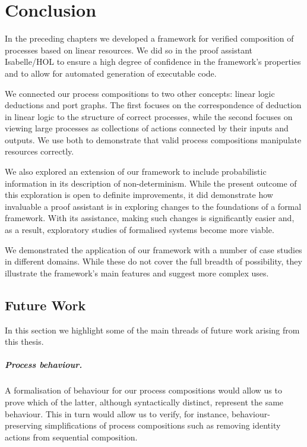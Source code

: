 \documentclass[class=smolathesis,crop=false]{standalone}
\begin{document}
\chapter{Conclusion}
\label{ch:conc}

In the preceding chapters we developed a framework for verified composition of processes based on linear resources.
We did so in the proof assistant Isabelle/HOL to ensure a high degree of confidence in the framework's properties and to allow for automated generation of executable code.

We connected our process compositions to two other concepts: linear logic deductions and port graphs.
The first focuses on the correspondence of deduction in linear logic to the structure of correct processes, while the second focuses on viewing large processes as collections of actions connected by their inputs and outputs.
We use both to demonstrate that valid process compositions manipulate resources correctly.

We also explored an extension of our framework to include probabilistic information in its description of non-determinism.
While the present outcome of this exploration is open to definite improvements, it did demonstrate how invaluable a proof assistant is in exploring changes to the foundations of a formal framework.
With its assistance, making such changes is significantly easier and, as a result, exploratory studies of formalised systems become more viable.

We demonstrated the application of our framework with a number of case studies in different domains.
While these do not cover the full breadth of possibility, they illustrate the framework's main features and suggest more complex uses.

\section{Future Work}
\label{sec:conc/future}

In this section we highlight some of the main threads of future work arising from this thesis.

\paragraph*{Process behaviour.}
A formalisation of behaviour for our process compositions would allow us to prove which of the latter, although syntactically distinct, represent the same behaviour.
This in turn would allow us to verify, for instance, behaviour-preserving simplifications of process compositions such as removing identity actions from sequential composition.
\end{document}

